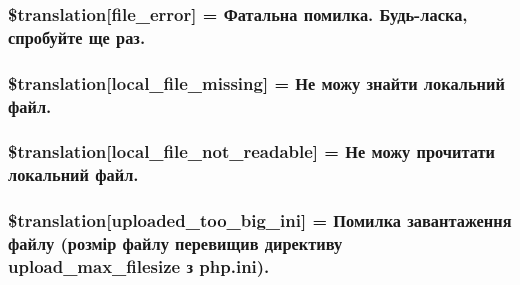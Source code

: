 \subsubsection[{\$translation}]{\setlength{\rightskip}{0pt plus 5cm}\$translation\mbox{[}\textquotesingle{}file\+\_\+error\textquotesingle{}\mbox{]} = \textquotesingle{}Фатальна помилка. Будь-\/ласка, спробуйте ще раз.\textquotesingle{}}\label{class_8upload_8uk___u_a_8php_ac7498e49b9771b04698029aa61c70821}
\hypertarget{class_8upload_8uk___u_a_8php_a6ec3d3a47ab70d77e7aa593e82ead10e}{}
\subsubsection[{\$translation}]{\setlength{\rightskip}{0pt plus 5cm}\$translation\mbox{[}\textquotesingle{}local\+\_\+file\+\_\+missing\textquotesingle{}\mbox{]} = \textquotesingle{}Не можу знайти локальний файл.\textquotesingle{}}\label{class_8upload_8uk___u_a_8php_a6ec3d3a47ab70d77e7aa593e82ead10e}
\hypertarget{class_8upload_8uk___u_a_8php_a60104befef9b241f3a7a6a755618a4b3}{}
\subsubsection[{\$translation}]{\setlength{\rightskip}{0pt plus 5cm}\$translation\mbox{[}\textquotesingle{}local\+\_\+file\+\_\+not\+\_\+readable\textquotesingle{}\mbox{]} = \textquotesingle{}Не можу прочитати локальний файл.\textquotesingle{}}\label{class_8upload_8uk___u_a_8php_a60104befef9b241f3a7a6a755618a4b3}
\hypertarget{class_8upload_8uk___u_a_8php_a6a08dcd0d3651fdd098568f6b2f0a42c}{}
\subsubsection[{\$translation}]{\setlength{\rightskip}{0pt plus 5cm}\$translation\mbox{[}\textquotesingle{}uploaded\+\_\+too\+\_\+big\+\_\+ini\textquotesingle{}\mbox{]} = \textquotesingle{}Помилка завантаження файлу (розмір файлу перевищив директиву upload\+\_\+max\+\_\+filesize з php.\+ini).\textquotesingle{}}\label{class_8upload_8uk___u_a_8php_a6a08dcd0d3651fdd098568f6b2f0a42c}
\hypertarget{class_8upload_8uk___u_a_8php_a623d5b8b92169f57d7e43458aa911cbb}{}
